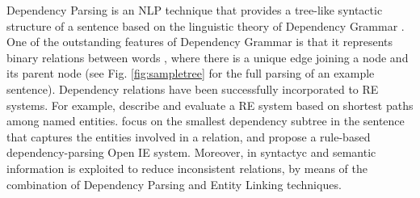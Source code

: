 



Dependency Parsing is an NLP technique that provides a tree-like syntactic structure of a sentence based on the linguistic theory of Dependency Grammar \citep{Tesniere1959}. One of the outstanding features of Dependency Grammar is that it represents binary relations between words \citep{BallesterosNivre2013}, where there is a unique edge joining a node and its parent node (see Fig. \ref{fig:sampletree} for the full parsing of an example sentence).
Dependency relations have been successfully incorporated to RE systems. For example, \citep{BunescuandMooney2005} describe and evaluate a RE system based on shortest paths among named entities. \citep{CulottaSorensen2004} focus on the smallest dependency subtree in the sentence that captures the entities involved in a relation, and \citep{Gamallo2012} propose a rule-based dependency-parsing Open IE system. Moreover, in \citep{Nakasholeetal2012,MoroandNavigli2012,DelliBovietal2015b,} syntactyc and semantic information is exploited to reduce inconsistent relations, by means of the combination of Dependency Parsing and Entity Linking techniques.


